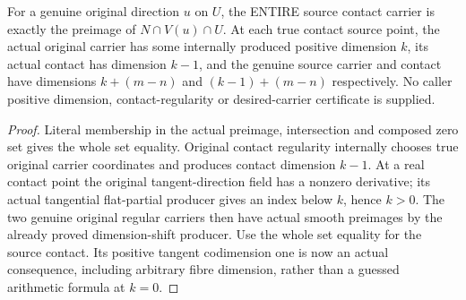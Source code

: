 \begin{theorem}
\label{hir:submersion-tangent-contact-actual-carriers}
\leanok
For a genuine original direction $u$ on $U$, the ENTIRE source contact carrier
is exactly the preimage of $N\cap V(u)\cap U$. At each true contact source point,
the actual original carrier has some internally produced positive dimension
$k$, its actual contact has dimension $k-1$, and the genuine source carrier
and contact have dimensions $k+(m-n)$ and $(k-1)+(m-n)$ respectively. No
caller positive dimension, contact-regularity or desired-carrier certificate
is supplied.
\end{theorem}
\begin{proof}
Literal membership in the actual preimage, intersection and composed zero
set gives the whole set equality. Original contact regularity internally
chooses true original carrier coordinates and produces contact dimension
$k-1$. At a real contact point the original tangent-direction field has a
nonzero derivative; its actual tangential flat-partial producer gives an
index below $k$, hence $k>0$. The two genuine original regular carriers then
have actual smooth preimages by the already proved dimension-shift producer.
Use the whole set equality for the source contact. Its positive tangent
codimension one is now an actual consequence, including arbitrary fibre
dimension, rather than a guessed arithmetic formula at $k=0$.
\end{proof}

